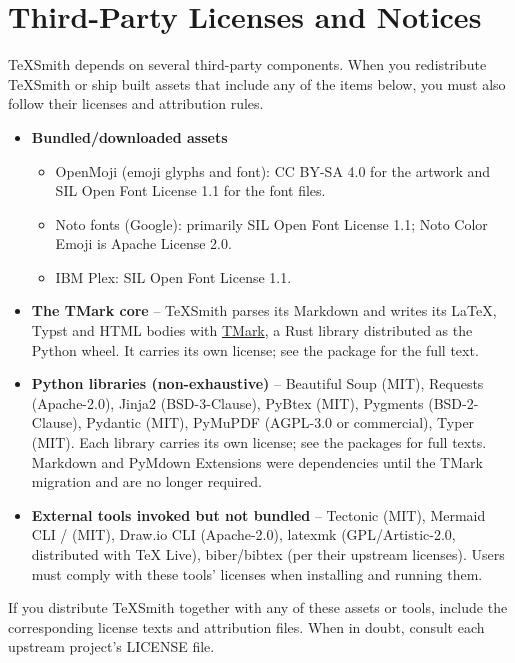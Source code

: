 \documentclass[a4paper,twoside]{article}
\begin{document}
\section{Third-Party Licenses and Notices}
TeXSmith depends on several third-party components. When you redistribute TeXSmith or ship built assets that include any of the items below, you must also follow their licenses and attribution rules.
\begin{itemize}
\item \textbf{Bundled/downloaded assets}
\begin{itemize}
\item OpenMoji (emoji glyphs and font): CC BY-SA 4.0 for the artwork and SIL Open Font License 1.1 for the font files.
\item Noto fonts (Google): primarily SIL Open Font License 1.1; Noto Color Emoji is Apache License 2.0.
\item IBM Plex: SIL Open Font License 1.1.
\end{itemize}
\item \textbf{The TMark core} -- TeXSmith parses its Markdown and writes its \LaTeX{}, Typst and HTML bodies with \href{https://github.com/yves-chevallier/tmark}{TMark}, a Rust library distributed as the  Python wheel. It carries its own license; see the package for the full text.
\item \textbf{Python libraries (non-exhaustive)} -- Beautiful Soup (MIT), Requests (Apache-2.0), Jinja2 (BSD-3-Clause), PyBtex (MIT), Pygments (BSD-2-Clause), Pydantic (MIT), PyMuPDF (AGPL-3.0 or commercial), Typer (MIT). Each library carries its own license; see the packages for full texts. Markdown and PyMdown Extensions were dependencies until the TMark migration and are no longer required.
\item \textbf{External tools invoked but not bundled} -- Tectonic (MIT), Mermaid CLI /  (MIT), Draw.io CLI (Apache-2.0), latexmk (GPL/Artistic-2.0, distributed with \TeX{} Live), biber/bibtex (per their upstream licenses). Users must comply with these tools' licenses when installing and running them.
\end{itemize}
If you distribute TeXSmith together with any of these assets or tools, include the corresponding license texts and attribution files. When in doubt, consult each upstream project's LICENSE file.
\end{document}
